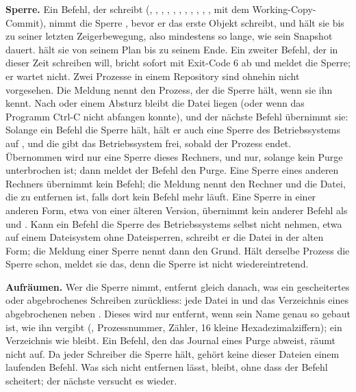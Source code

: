{\bf Sperre.} Ein Befehl, der schreibt (, , ,
, , , , , ,
, ,
 mit dem Working-Copy-Commit),
nimmt die Sperre , bevor er das erste Objekt schreibt,
und hält sie bis zu seiner letzten Zeigerbewegung, also mindestens so lange, wie sein Snapshot
dauert.  hält sie von seinem Plan bis zu seinem Ende.
Ein zweiter Befehl, der in dieser Zeit schreiben will, bricht sofort mit Exit-Code 6 ab und meldet
die Sperre; er wartet nicht. Zwei Prozesse in einem Repository sind ohnehin nicht vorgesehen.
Die Meldung nennt den Prozess, der die Sperre hält, wenn sie ihn kennt.
Nach  oder einem Absturz bleibt die Datei liegen (oder wenn das Programm Ctrl-C
nicht abfangen konnte), und der nächste Befehl übernimmt sie: Solange ein Befehl die Sperre hält,
hält er auch eine Sperre des Betriebssystems auf , und die gibt das
Betriebssystem frei, sobald der Prozess endet. Übernommen wird nur eine Sperre dieses Rechners,
und nur, solange kein Purge unterbrochen ist; dann meldet der Befehl den Purge.
Eine Sperre eines anderen Rechners übernimmt kein Befehl; die Meldung nennt den Rechner und die
Datei, die zu entfernen ist, falls dort kein Befehl mehr läuft.
Eine Sperre in einer anderen Form, etwa von einer älteren Version, übernimmt kein anderer Befehl
als  und .
Kann ein Befehl die Sperre des Betriebssystems selbst nicht nehmen, etwa auf einem Dateisystem
ohne Dateisperren, schreibt er die Datei in der alten Form; die Meldung einer Sperre nennt dann
den Grund.
Hält derselbe Prozess die Sperre schon, meldet sie das, denn die Sperre ist nicht wiedereintretend.

{\bf Aufräumen.} Wer die Sperre nimmt, entfernt gleich danach, was ein gescheitertes oder
abgebrochenes Schreiben zurückliess: jede Datei in  und das Verzeichnis
eines abgebrochenen  neben . Dieses wird nur entfernt, wenn sein Name
genau so gebaut ist, wie  ihn vergibt (, Prozessnummer, Zähler,
16 kleine Hexadezimalziffern); ein Verzeichnis wie  bleibt.
Ein Befehl, den das Journal eines Purge abweist, räumt nicht auf.
Da jeder Schreiber die Sperre hält, gehört keine dieser Dateien einem laufenden Befehl.
Was sich nicht entfernen lässt, bleibt, ohne dass der Befehl scheitert;
der nächste versucht es wieder.

